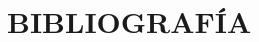 \chapter[Bibliografía]{
  \label{chp:bibliografia}
  BIBLIOGRAFÍA
}
\thispagestyle{numberingStyle}
\pagestyle{numberingStyle}